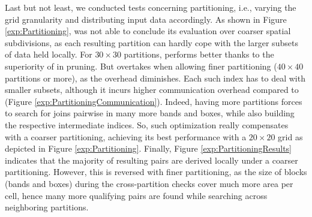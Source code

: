 Last but not least, we conducted tests concerning partitioning, i.e., varying the grid granularity and distributing input data accordingly. As shown in Figure \ref{exp:Partitioning}, \base was not able to conclude its evaluation over coarser spatial subdivisions, as each resulting partition can hardly cope with the larger subsets of data held locally. For $30 \times 30$ partitions, \opt performs better thanks to  the superiority of \btsr in pruning. But \base overtakes \opt when allowing finer partitioning ($40 \times 40$ partitions or more), as the \rtree overhead diminishes. Each such index has to deal with smaller subsets, although it incurs higher communication overhead compared to \opt (Figure \ref{exp:PartitioningCommunication}). Indeed, having more partitions forces \opt to search for joins pairwise in many more bands and boxes, while also building the respective intermediate indices. So, such optimization really compensates with a coarser partitioning, achieving its best performance with a $20 \times 20$ grid as depicted in Figure \ref{exp:Partitioning}. Finally, Figure \ref{exp:PartitioningResults} indicates that the majority of resulting pairs are derived locally under a coarser partitioning. However, this is reversed with finer partitioning, as the size of blocks (bands and boxes) during the cross-partition checks cover much more area per cell, hence many more qualifying pairs are found while searching across neighboring partitions.

